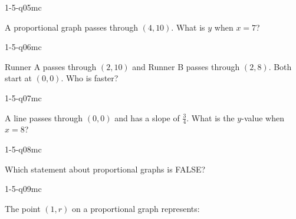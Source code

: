 \begin{practiceQuestion}{1-5-q05}{mc}
\begin{questionText}
A proportional graph passes through $(4, 10)$. What is $y$ when $x = 7$?
\end{questionText}
\end{practiceQuestion}

\begin{practiceQuestion}{1-5-q06}{mc}
\begin{questionText}
Runner A passes through $(2, 10)$ and Runner B passes through $(2, 8)$. Both start at $(0, 0)$. Who is faster?
\end{questionText}
\end{practiceQuestion}

\begin{practiceQuestion}{1-5-q07}{mc}
\begin{questionText}
A line passes through $(0, 0)$ and has a slope of $\frac{3}{4}$. What is the $y$-value when $x = 8$?
\end{questionText}
\end{practiceQuestion}

\begin{practiceQuestion}{1-5-q08}{mc}
\begin{questionText}
Which statement about proportional graphs is FALSE?
\end{questionText}
\end{practiceQuestion}

\begin{practiceQuestion}{1-5-q09}{mc}
\begin{questionText}
The point $(1, r)$ on a proportional graph represents:
\end{questionText}
\end{practiceQuestion}

